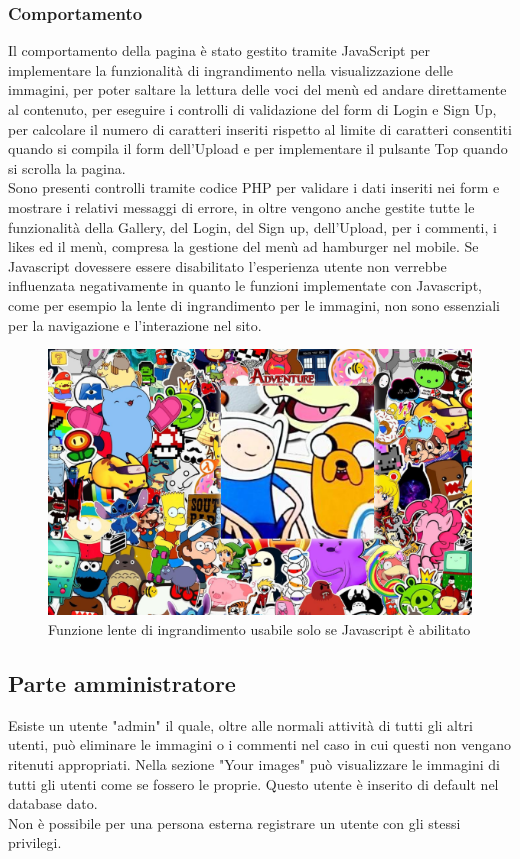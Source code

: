 \documentclass[openany, a4paper, 12pt]{report}
\begin{document}
			\subsubsection{Comportamento}
			Il comportamento della pagina è stato gestito tramite JavaScript per implementare la funzionalità di ingrandimento nella visualizzazione delle immagini, per poter saltare la lettura delle voci del menù ed andare direttamente al contenuto, per eseguire i controlli di validazione del form di Login e Sign Up, per calcolare il numero di caratteri inseriti rispetto al limite di caratteri consentiti quando si compila il form dell'Upload e per implementare il pulsante Top quando si scrolla la pagina.\\
			Sono presenti controlli tramite codice PHP per validare i dati inseriti nei form e mostrare i relativi messaggi di errore, in oltre vengono anche gestite tutte le funzionalità della Gallery, del Login, del Sign up, dell'Upload, per i commenti, i likes ed il menù, compresa la gestione del menù ad hamburger nel mobile. Se Javascript dovessere essere disabilitato l'esperienza utente non verrebbe influenzata negativamente in quanto le funzioni implementate con Javascript, come per esempio la lente di ingrandimento per le immagini, non sono essenziali per la navigazione e l'interazione nel sito.
			\begin{figure}[H]
				\centering
				\includegraphics[width=0.8\linewidth]{images/lente}
				\caption{Funzione lente di ingrandimento usabile solo se Javascript è abilitato}
			\end{figure}

	\subsection{Parte amministratore}
		Esiste un utente "admin" il quale, oltre alle normali attività di tutti gli altri utenti, può eliminare le immagini o i commenti nel caso in cui questi non vengano ritenuti appropriati. Nella sezione "Your images" può visualizzare le immagini di tutti gli utenti come se fossero le proprie.
		Questo utente è inserito di default nel database dato.\\
		Non è possibile per una persona esterna registrare un utente con gli stessi privilegi.
\end{document}
